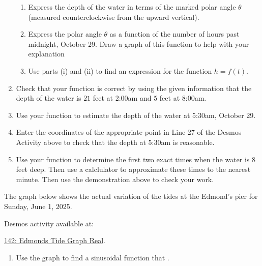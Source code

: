 \documentclass{ximera}
\begin{document}
\begin{example}
\begin{explanation}
\begin{enumerate}
\begin{enumerate}
\item Express the depth of the water in terms of the marked polar angle $\theta$ (measured counterclockwise from the upward vertical).

\item Express the polar angle $\theta$ as a function of the number of hours past midnight, October 29. Draw a graph of this function to help with your explanation

\item Use parts (i) and (ii) to find an expression for the function $h=f(t)$.
\end{enumerate}


\item Check that your function is correct by using the given information that the depth of the water is $21$ feet at 2:00am and $5$ feet at 8:00am.


\item Use your function to estimate the depth of the water at 5:30am, October 29.

\item Enter the coordinates of the appropriate point in Line 27 of the Desmos Activity above to check that the depth at 5:30am is reasonable.

\item Use your function to determine the first two exact times when the water is $8$ feet deep. Then use a calclulator to approximate these times to the nearest minute. Then use the demonstration above to check your work.

\end{enumerate}

\end{explanation}

\end{example}


\begin{example} \label{EXPODFefeRE}
The graph below shows the actual variation of the tides at the Edmond's pier for Sunday, June 1, 2025.


Desmos activity available at:

\href{https://www.desmos.com/calculator/kbjvcy5bs1}{142: Edmonds Tide Graph Real}.

 
\begin{onlineOnly}
    \begin{center}
\end{center}
\end{onlineOnly}

\begin{enumerate}
\item Use the graph to find a sinusoidal function that .
\end{enumerate}



\end{example}
\end{document}
